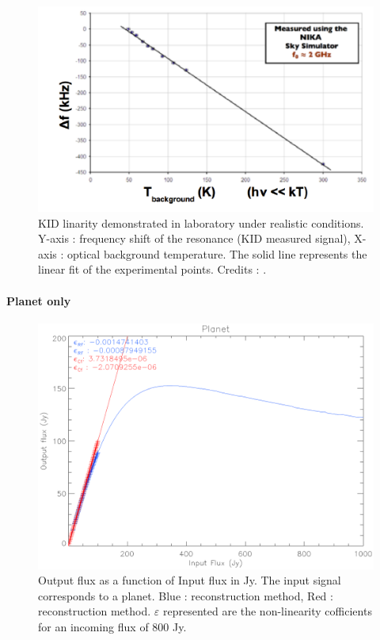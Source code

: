 \begin{figure}[h]
\center
	\includegraphics[scale=0.55]{Figures/KID-linearity-Monfardini2014.png}
	\caption{KID linarity demonstrated in laboratory under realistic conditions. Y-axis : frequency shift of the resonance (KID measured signal), X-axis : optical background temperature. The solid line represents the linear fit of the experimental points. Credits : \citet{2014JLTP..176..787M}.}
	\label{KID-lin}
\end{figure}

\paragraph{Planet only}

\begin{figure}[h]
\center
	\includegraphics[scale=0.55]{Figures/nl-planet.eps}
	\caption{Output flux as a function of Input flux in Jy. The input signal corresponds to a planet. Blue : \rf reconstruction method, Red : \cf reconstruction method. $\varepsilon$  represented are the non-linearity cofficients for an incoming flux of 800 Jy.}
	\label{fig:nl-planet}
\end{figure}

